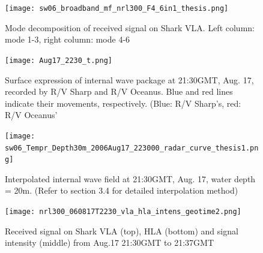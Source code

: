 \begin{figure}[center]
  \centering
  \texttt{[image: sw06\_broadband\_mf\_nrl300\_F4\_6in1\_thesis.png]}
  \caption{Mode decomposition of received signal on Shark VLA. 
    Left column: mode 1-3, right column: mode 4-6 }\label{fig:m2130}
\end{figure}
\clearpage


\begin{figure}[center]
  \centering
  \texttt{[image: Aug17\_2230\_t.png]}
  \caption{Surface expression of internal wave package at 21:30GMT, Aug. 17, recorded by R/V Sharp and R/V Oceanus. Blue and red lines indicate their movements, respectively. (Blue: R/V Sharp's, red: R/V Oceanus'}\label{fig:r2130_r}
\end{figure}

\begin{figure}[center]
 \centering
 \texttt{[image: sw06\_Tempr\_Depth30m\_2006Aug17\_223000\_radar\_curve\_thesis1.png]}
 \caption{Interpolated internal wave field at 21:30GMT, Aug. 17, water depth = 20m. (Refer to section 3.4 for detailed interpolation method)}\label{fig:r2130_i}
\end{figure}

\begin{figure}[center]
  \centering
  \texttt{[image: nrl300\_060817T2230\_vla\_hla\_intens\_geotime2.png]}
  \caption{Received signal on Shark VLA (top), HLA (bottom) and signal intensity (middle) from Aug.17 21:30GMT to 21:37GMT }\label{fig:a2130}
\end{figure}



